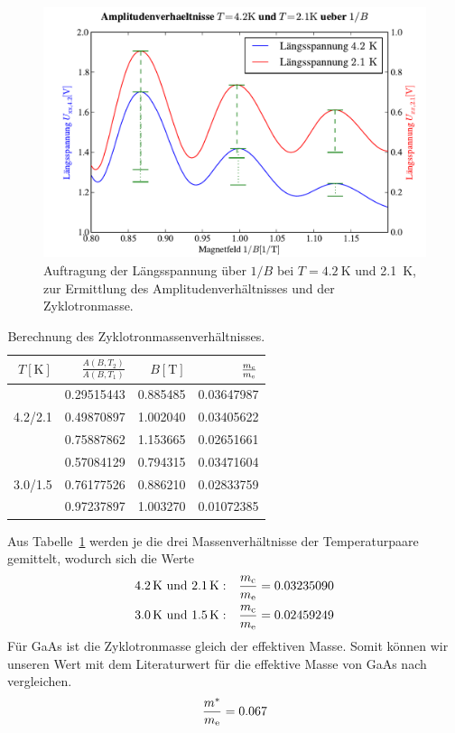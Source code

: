 \documentclass[paper=a4,fontsize=10pt,DIV=18,twocolumn,parskip=half]{scrartcl}
\numberwithin{equation}{section}    %
\begin{document}
\begin{figure}[htp]
	\begin{center}
		\includegraphics[width=\columnwidth]{Data-Plots/12-4,2-2,1-zyklotron-1-B.pdf}
		\caption{Auftragung der Längsspannung über $1/B$ bei $T=\SI{4.2}{\kelvin}$ und \SI{2.1}{\kelvin}, zur Ermittlung des Amplitudenverhältnisses und der Zyklotronmasse.}
		\label{fig:zyklotronmasse2}
	\end{center}
\end{figure}

\begin{table}[htp]
	\begin{center}
		\begin{tabular}{r|rrr}
			\hline
			$T[\mathrm{K}]$ & $\frac{A(B,T_2)}{A(B,T_1)}$ & $B[\mathrm{T}]$ & $\frac{m_{\rm c}}{m_{\rm e}}$\\
			\hline
			 		& 0.29515443 & 0.885485 & 0.03647987 \\
			4.2/2.1 & 0.49870897 & 1.002040 & 0.03405622 \\
			 		& 0.75887862 & 1.153665 & 0.02651661 \\
			\hline
					& 0.57084129 & 0.794315 & 0.03471604 \\
			3.0/1.5 & 0.76177526 & 0.886210 & 0.02833759 \\
					& 0.97237897 & 1.003270 & 0.01072385 \\
		\end{tabular}
		\caption{Berechnung des Zyklotronmassenverhältnisses.}
		\label{tab:zyklotronmasse}
	\end{center}
\end{table}
Aus Tabelle~\ref{tab:zyklotronmasse} werden je die drei Massenverhältnisse der Temperaturpaare gemittelt, wodurch sich die Werte
\begin{align}
	\SI{4.2}{\kelvin}\text{ und }\SI{2.1}{\kelvin}: && \frac{m_{\rm c}}{m_{\rm e}} = 0.03235090 \\
	\SI{3.0}{\kelvin}\text{ und }\SI{1.5}{\kelvin}: && \frac{m_{\rm c}}{m_{\rm e}} = 0.02459249
\end{align}
Für GaAs ist die Zyklotronmasse gleich der effektiven Masse. Somit können wir unseren Wert mit dem Literaturwert für die effektive Masse von GaAs nach~\citet{saarland} vergleichen.
\begin{equation}
	\frac{m^*}{m_{\rm e}} = 0.067
\end{equation}
\end{document}
